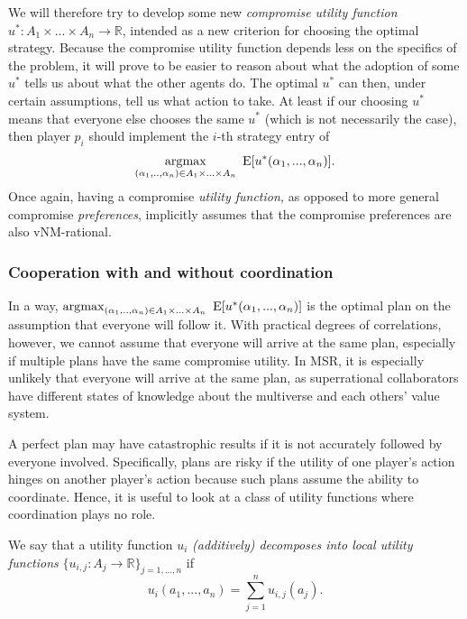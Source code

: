 We will therefore try to develop some new \emph{compromise utility
function} \(u^{*}:A_{1} \times \text{...} \times A_{n} \rightarrow \mathbb{R}\),
intended as a new criterion for choosing the optimal strategy. Because
the compromise utility function depends less on the specifics of the
problem, it will prove to be easier to reason about what the adoption of
some \(u^{*}\) tells us about what the other agents do. The optimal
\(u^{*}\) can then, under certain assumptions, tell us what action to
take. At least if our choosing \(u^{*}\) means that everyone else
chooses the same \(u^{*}\) (which is not necessarily the case), then
player \(p_{i}\) should implement the \(i\)-th strategy entry of
$$
\operatorname*{\arg\!\max}_{(\alpha_{1},..,\alpha_{n}) \in A_{1} \times \text{...} \times A_{n}}\ \mathrm{E}\lbrack u^{*}(\alpha_{1},...,\alpha_{n})\rbrack.
$$
Once again, having a compromise \emph{utility function,} as opposed to
more general compromise \emph{preferences}, implicitly assumes that the
compromise preferences are also vNM-rational.

\hypertarget{cooperation-with-and-without-coordination}{\subsubsection{Cooperation
with and without
coordination}\label{cooperation-with-and-without-coordination}}

In a way, \(\operatorname*{\arg\!\max}_{(\alpha_{1},..,\alpha_{n}) \in A_{1} \times \text{...} \times A_{n}}\
\mathrm{E}\lbrack u^{*}(\alpha_{1},...,\alpha_{n})\rbrack\) is the optimal plan on the assumption
that everyone will follow it. With practical degrees of correlations, however, we cannot assume that
everyone will arrive at the same plan, especially if multiple plans have
the same compromise utility. In MSR, it is especially unlikely that
everyone will arrive at the same plan, as superrational collaborators
have different states of knowledge about the multiverse and each others'
value system.

A perfect plan may have catastrophic results if it is not accurately
followed by everyone involved. Specifically, plans are risky if the
utility of one player's action hinges on another player's action because
such plans assume the ability to coordinate. Hence, it is useful to look
at a class of utility functions where coordination plays no role.

We say that a utility function \(u_{i}\) \emph{(additively) decomposes
into local utility functions}
\(\{ u_{i,j}:A_j \rightarrow \mathbb{R}\}_{j = 1,...,n}\) if
$$
u_{i}(a_{1},...,a_{n}) = \sum_{j=1}^n u_{i,j}(a_{j}).
$$

